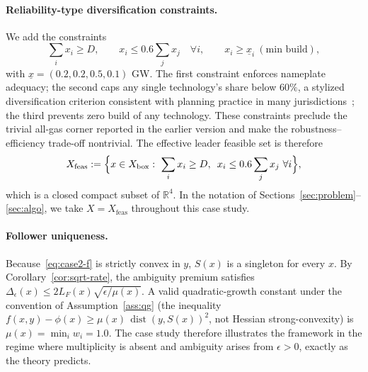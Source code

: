 \documentclass[11pt]{article}
\theoremstyle{definition}
\newcommand{\R}{\mathbb{R}}
\newcommand{\eps}{\epsilon}
\DeclareMathOperator{\dist}{dist}
\begin{document}
\paragraph{Reliability-type diversification constraints.}
We add the constraints
\begin{equation}\label{eq:case2-rely}
  \sum_i x_i\ge D,
  \qquad
  x_i\le 0.6\sum_j x_j \quad \forall i,
  \qquad
  x_i\ge \underline x_i\ (\text{min build}),
\end{equation}
with $\underline x=(0.2,0.2,0.5,0.1)$ GW. The first constraint
enforces nameplate adequacy; the second caps any single
technology's share below $60\%$, a stylized diversification
criterion consistent with planning practice in many
jurisdictions~\cite{kahrobaee2010short,joskow2011comparing,billimoria2019market,
macdonald2016future,denholm2021challenges}; the third prevents zero
build of any technology. These constraints preclude the trivial
all-gas corner reported in the earlier version and make the
robustness--efficiency trade-off nontrivial. The effective leader
feasible set is therefore
\begin{equation}\label{eq:case2-Xfeas}
  X_{\mathrm{feas}}
  :=\Bigl\{x\in X_{\mathrm{box}}:\
  \sum_i x_i\ge D,\ \,
  x_i\le 0.6\sum_j x_j\ \forall i\Bigr\},
\end{equation}
which is a closed compact subset of $\R^4$. In the notation of
Sections~\ref{sec:problem}--\ref{sec:algo}, we take
$X=X_{\mathrm{feas}}$ throughout this case study.

\paragraph{Follower uniqueness.}
Because~\eqref{eq:case2-f} is strictly convex in $y$, $S(x)$ is a
singleton for every $x$. By Corollary~\ref{cor:sqrt-rate}, the
ambiguity premium satisfies
$\Delta_\eps(x)\le 2L_F(x)\sqrt{\eps/\mu(x)}$. A valid
quadratic-growth constant under the convention of
Assumption~\ref{ass:qg} (the inequality
$f(x,y)-\phi(x)\ge\mu(x)\,\dist(y,S(x))^2$, not Hessian
strong-convexity) is $\mu(x)=\min_i w_i=1.0$. The case study
therefore illustrates the framework in the regime where
multiplicity is absent and ambiguity arises from $\eps>0$,
exactly as the theory predicts.
\end{document}
